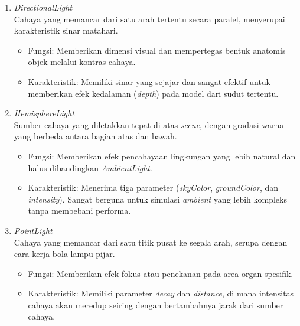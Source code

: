 \documentclass[a4paper,twoside]{article}
\begin{document}
\begin{enumerate}
\begin{itemize}
\begin{enumerate}
                        \item \textit{DirectionalLight} \\
                        Cahaya yang memancar dari satu arah tertentu secara paralel, menyerupai karakteristik sinar matahari.
                        \begin{itemize}
                            \item Fungsi: Memberikan dimensi visual dan mempertegas bentuk anatomis objek melalui kontras cahaya.
                            \item Karakteristik: Memiliki sinar yang sejajar dan sangat efektif untuk memberikan efek kedalaman (\textit{depth}) pada model dari sudut tertentu.
                        \end{itemize}
            
                        \item \textit{HemisphereLight} \\
                        Sumber cahaya yang diletakkan tepat di atas \textit{scene}, dengan gradasi warna yang berbeda antara bagian atas dan bawah.
                        \begin{itemize}
                            \item Fungsi: Memberikan efek pencahayaan lingkungan yang lebih natural dan halus dibandingkan \textit{AmbientLight}.
                            \item Karakteristik: Menerima tiga parameter (\textit{skyColor}, \textit{groundColor}, dan \textit{intensity}). Sangat berguna untuk simulasi \textit{ambient} yang lebih kompleks tanpa membebani performa.
                        \end{itemize}
                
                        \item \textit{PointLight} \\
                        Cahaya yang memancar dari satu titik pusat ke segala arah, serupa dengan cara kerja bola lampu pijar.
                        \begin{itemize}
                            \item Fungsi: Memberikan efek fokus atau penekanan pada area organ spesifik.
                            \item Karakteristik: Memiliki parameter \textit{decay} dan \textit{distance}, di mana intensitas cahaya akan meredup seiring dengan bertambahnya jarak dari sumber cahaya.
                        \end{itemize}
                

\end{enumerate}
\end{itemize}
\end{enumerate}
\end{document}
